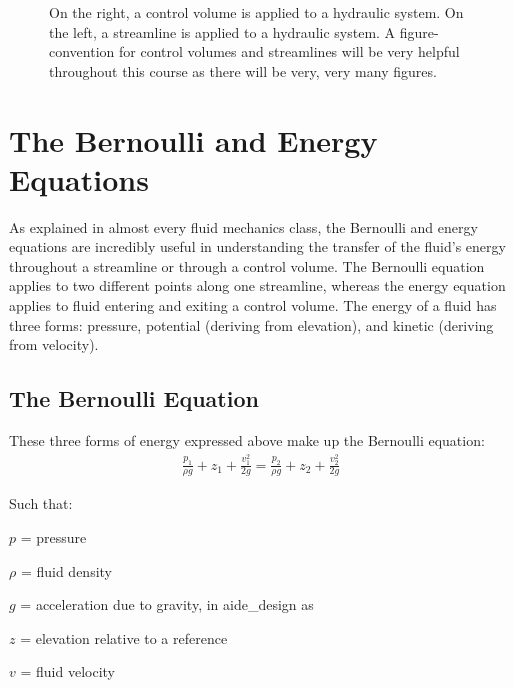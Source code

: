 \documentclass[letterpaper,10pt,english]{sphinxmanual}
\let\sphinxpxdimen\pdfpxdimen\else\newdimen\sphinxpxdimen
\begin{document}
\begin{figure}[htbp]
\centering
\capstart

\noindent\sphinxincludegraphics[width=650\sphinxpxdimen]{{image_control_volumes}.png}
\caption{On the right, a control volume is applied to a hydraulic system. On the left, a streamline is applied to a hydraulic system. A figure-convention for control volumes and streamlines will be very helpful throughout this course as there will be very, very many figures.}\label{\detokenize{Fluids_Review/Fluids_Review_Design:id14}}\label{\detokenize{Fluids_Review/Fluids_Review_Design:image-control-volumes}}\end{figure}


\section{The Bernoulli and Energy Equations}
\label{\detokenize{Fluids_Review/Fluids_Review_Design:the-bernoulli-and-energy-equations}}\label{\detokenize{Fluids_Review/Fluids_Review_Design:bernoulli-and-energy-equations}}
As explained in almost every fluid mechanics class, the Bernoulli and energy equations are incredibly useful in understanding the transfer of the fluid’s energy throughout a streamline or through a control volume. The Bernoulli equation applies to two different points along one streamline, whereas the energy equation applies to fluid entering and exiting a control volume. The energy of a fluid has three forms: pressure, potential (deriving from elevation), and kinetic (deriving from velocity).


\subsection{The Bernoulli Equation}
\label{\detokenize{Fluids_Review/Fluids_Review_Design:the-bernoulli-equation}}\label{\detokenize{Fluids_Review/Fluids_Review_Design:bernoulli-equation}}
These three forms of energy expressed above make up the Bernoulli equation:
\begin{equation}\label{equation:Fluids_Review/Fluids_Review_Design:Fluids_Review/Fluids_Review_Design:6}
\begin{split}\frac{p_1}{\rho g} + {z_1} + \frac{v_1^2}{2g} = \frac{p_2}{\rho g} + {z_2} + \frac{v_2^2}{2g}\end{split}
\end{equation}
\begin{DUlineblock}{0em}
\item[] Such that:
\item[] \(p\) = pressure
\item[] \(\rho\) = fluid density
\item[] \(g\) = acceleration due to gravity, in aide\_design as 
\item[] \(z\) = elevation relative to a reference
\item[] \(v\) = fluid velocity
\end{DUlineblock}
\end{document}
